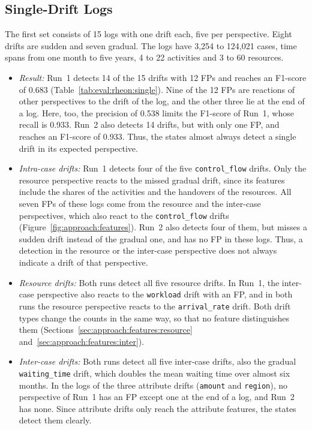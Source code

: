 \subsection{Single-Drift Logs}
\label{sec:eval:rheon:single}
The first set consists of 15 logs with one drift each, five per perspective. Eight drifts are sudden and seven gradual. The logs have 3,254 to 124,021 cases, time spans from one month to five years, 4 to 22 activities and 3 to 60 resources.
\begin{itemize}
	\item \emph{Result:} Run~1 detects 14 of the 15 drifts with 12 FPs and reaches an F1-score of 0.683 (Table~\ref{tab:eval:rheon:single}). Nine of the 12 FPs are reactions of other perspectives to the drift of the log, and the other three lie at the end of a log. Here, too, the precision of 0.538 limits the F1-score of Run~1, whose recall is 0.933. Run~2 also detects 14 drifts, but with only one FP, and reaches an F1-score of 0.933. Thus, the states almost always detect a single drift in its expected perspective.
	\item \emph{Intra-case drifts:} \label{sec:eval:rheon:single:intra} Run~1 detects four of the five \texttt{control\_flow} drifts. Only the resource perspective reacts to the missed gradual drift, since its features include the shares of the activities and the handovers of the resources. All seven FPs of these logs come from the resource and the inter-case perspectives, which also react to the \texttt{control\_flow} drifts (Figure~\ref{fig:approach:features}). Run~2 also detects four of them, but misses a sudden drift instead of the gradual one, and has no FP in these logs. Thus, a detection in the resource or the inter-case perspective does not always indicate a drift of that perspective.
	\item \emph{Resource drifts:} \label{sec:eval:rheon:single:resource} Both runs detect all five resource drifts. In Run~1, the inter-case perspective also reacts to the \texttt{workload} drift with an FP, and in both runs the resource perspective reacts to the \texttt{arrival\_rate} drift. Both drift types change the counts in the same way, so that no feature distinguishes them (Sections~\ref{sec:approach:features:resource} and~\ref{sec:approach:features:inter}).
	\item \emph{Inter-case drifts:} \label{sec:eval:rheon:single:inter} Both runs detect all five inter-case drifts, also the gradual \texttt{waiting\_time} drift, which doubles the mean waiting time over almost six months. In the logs of the three attribute drifts (\texttt{amount} and \texttt{region}), no perspective of Run~1 has an FP except one at the end of a log, and Run~2 has none. Since attribute drifts only reach the attribute features, the states detect them clearly.

\end{itemize}
